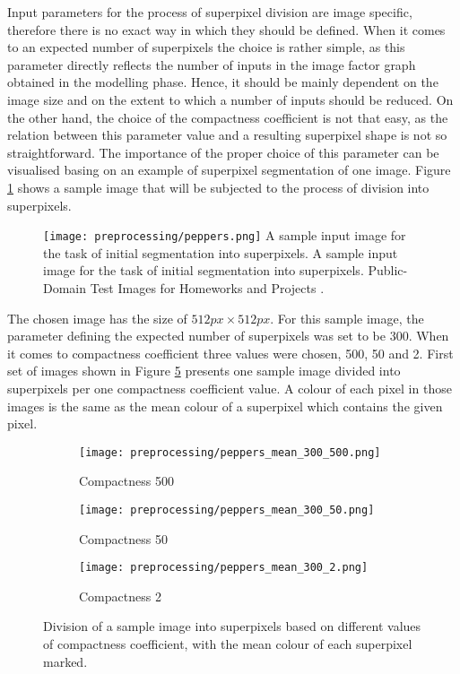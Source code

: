 Input parameters for the process of superpixel division are image specific, therefore there is no exact way in which they should be defined. When it comes to an expected number of superpixels the choice is rather simple, as this parameter directly reflects the number of inputs in the image factor graph obtained in the modelling phase. Hence, it should be mainly dependent on the image size and on the extent to which a number of inputs should be reduced. On the other hand, the choice of the compactness coefficient is not that easy, as the relation between this parameter value and a resulting superpixel shape is not so straightforward. The importance of the proper choice of this parameter can be visualised basing on an example of superpixel segmentation of one image. Figure \ref{fig:peppers} shows a sample image that will be subjected to the process of division into superpixels.
\begin{figure}[ht]
    \centering
    \texttt{[image: preprocessing/peppers.png]}
    \captionsource
    {A sample input image for the task of initial segmentation into superpixels.}
    {A sample input image for the task of initial segmentation into superpixels.}
    {Public-Domain Test Images for Homeworks and Projects \cite{peppers}.}
     \label{fig:peppers}
\end{figure}
The chosen image has the size of $512px \times 512px$. For this sample image, the parameter defining the expected number of superpixels was set to be $300$. When it comes to compactness coefficient three values were chosen, 500, 50 and 2. First set of images shown in Figure \ref{fig:peppers_mean_colour} presents one sample image divided into superpixels per one compactness coefficient value. A colour of each pixel in those images is the same as the mean colour of a superpixel which contains the given pixel.  
\begin{figure}[ht]
 \centering
  \begin{subfigure}[h]{0.32\textwidth}
    \texttt{[image: preprocessing/peppers\_mean\_300\_500.png]}
    \caption{Compactness 500}
    \label{fig:peppers_mean_colour_500}
  \end{subfigure}
  \begin{subfigure}[h]{0.32\textwidth}
    \texttt{[image: preprocessing/peppers\_mean\_300\_50.png]}
    \caption{Compactness 50}
    \label{fig:peppers_mean_colour_50}
  \end{subfigure}
    \begin{subfigure}[h]{0.32\textwidth}
    \texttt{[image: preprocessing/peppers\_mean\_300\_2.png]}
    \caption{Compactness 2}
    \label{fig:peppers_mean_colour_2}
  \end{subfigure}
    \caption{Division of a sample image into superpixels based on different values of compactness coefficient, with the mean colour of each superpixel marked.}%
    \label{fig:peppers_mean_colour}
\end{figure}
